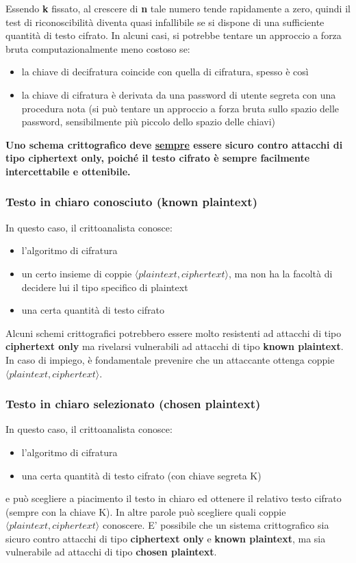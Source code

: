 Essendo \textbf{k} fissato, al crescere di \textbf{n} tale numero tende rapidamente a zero, quindi il test di riconoscibilità diventa quasi infallibile se si dispone di una sufficiente quantità di testo cifrato. In alcuni casi, si potrebbe tentare un approccio a forza bruta computazionalmente meno costoso se:
\begin{itemize} 
  \item la chiave di decifratura coincide con quella di cifratura, spesso è così
  \item la chiave di cifratura è derivata da una password di utente segreta con una procedura nota (si può tentare un approccio a forza bruta sullo spazio delle password, sensibilmente più piccolo dello spazio delle chiavi)
\end{itemize}
\textbf{Uno schema crittografico deve \underline{sempre} essere sicuro contro attacchi di tipo ciphertext only, poiché il testo cifrato è sempre facilmente intercettabile e ottenibile.}

\subsubsection{Testo in chiaro conosciuto (known plaintext)}
In questo caso, il crittoanalista conosce:
\begin{itemize} 
  \item l'algoritmo di cifratura
  \item un certo insieme di coppie $\langle plaintext, ciphertext \rangle$, ma non ha la facoltà di decidere lui il tipo specifico di plaintext
  \item una certa quantità di testo cifrato
\end{itemize}
Alcuni schemi crittografici potrebbero essere molto resistenti ad attacchi di tipo \textbf{ciphertext only} ma rivelarsi vulnerabili ad attacchi di tipo \textbf{known plaintext}. In caso di impiego, è fondamentale prevenire che un attaccante ottenga coppie $\langle plaintext, ciphertext \rangle$.

\subsubsection{Testo in chiaro selezionato (chosen plaintext)}
In questo caso, il crittoanalista conosce:
\begin{itemize} 
  \item l'algoritmo di cifratura
  \item una certa quantità di testo cifrato (con chiave segreta K)
\end{itemize}
e può scegliere a piacimento il testo in chiaro ed ottenere il relativo testo cifrato (sempre con la chiave K). In altre parole può scegliere quali coppie $\langle plaintext, ciphertext \rangle$ conoscere. E' possibile che un sistema crittografico sia sicuro contro attacchi di tipo \textbf{ciphertext only} e \textbf{known plaintext}, ma sia vulnerabile ad attacchi di tipo \textbf{chosen plaintext}.


